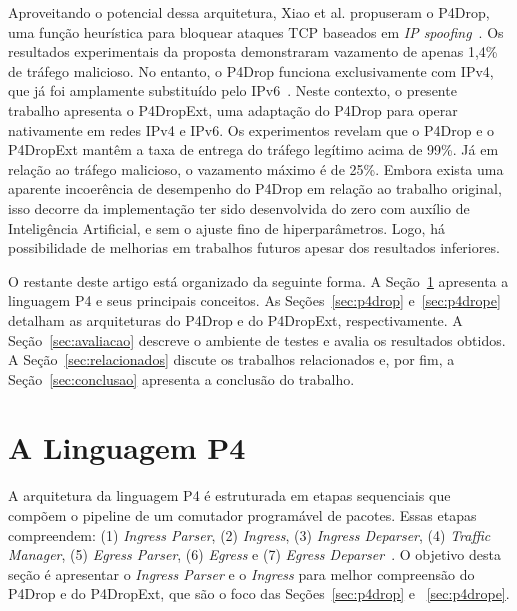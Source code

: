 \documentclass[12pt]{article}
\begin{document}
Aproveitando o potencial dessa arquitetura, Xiao et al. propuseram o P4Drop,
uma função heurística para bloquear ataques TCP baseados em \textit{IP spoofing}~\cite{p4drop}.
Os resultados experimentais da proposta demonstraram vazamento de apenas 1,4\% de tráfego malicioso.
No entanto, o P4Drop funciona exclusivamente com IPv4,
que já foi amplamente substituído pelo IPv6~\cite{ipv6stat}.
Neste contexto, o presente trabalho apresenta o P4DropExt,
uma adaptação do P4Drop para operar nativamente em redes IPv4 e IPv6.
Os experimentos revelam que o P4Drop e o P4DropExt mantêm a taxa de entrega do tráfego legítimo acima de 99\%.
Já em relação ao tráfego malicioso, o vazamento máximo é de 25\%.
Embora exista uma aparente incoerência de desempenho do P4Drop em relação ao trabalho original,
isso decorre da implementação ter sido desenvolvida do zero com auxílio de Inteligência Artificial, e sem o ajuste fino de hiperparâmetros.
Logo, há possibilidade de melhorias em trabalhos futuros apesar dos resultados inferiores.

O restante deste artigo está organizado da seguinte forma.
A Seção~\ref{sec:p4} apresenta a linguagem P4 e seus principais conceitos.
As Seções~\ref{sec:p4drop} e~\ref{sec:p4drope} detalham as arquiteturas do P4Drop e do P4DropExt, respectivamente.
A Seção~\ref{sec:avaliacao} descreve o ambiente de testes e avalia os resultados obtidos.
A Seção~\ref{sec:relacionados} discute os trabalhos relacionados e,
por fim, a Seção~\ref{sec:conclusao} apresenta a conclusão do trabalho.


\section{A Linguagem P4}
\label{sec:p4}

A arquitetura da linguagem P4 é estruturada
em etapas sequenciais que compõem o pipeline de um comutador programável de pacotes.
Essas etapas compreendem: (1) \textit{Ingress Parser}, (2) \textit{Ingress}, (3) \textit{Ingress Deparser},
(4) \textit{Traffic Manager}, (5) \textit{Egress Parser}, (6) \textit{Egress} e (7) \textit{Egress Deparser}~\cite{p4_psa_spec}.
O objetivo desta seção é apresentar o \textit{Ingress Parser} e o \textit{Ingress} para melhor compreensão do P4Drop e do P4DropExt,
que são o foco das Seções~\ref{sec:p4drop} e ~\ref{sec:p4drope}.
\end{document}
